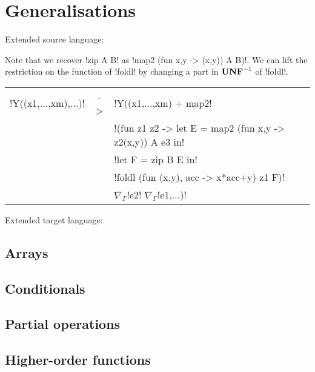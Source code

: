 \section{Generalisations}
\label{sec:generalisation}

Extended source language:



% 

Note that we recover !zip A B! as !map2 (fun x,y -> (x,y)) A B)!. 
We can lift the restriction on the function of !foldl! by changing a part in $\mathbf{UNF}^{-1}$ of !foldl!.
\begin{center}
\begin{tabular}{r c l}
    !Y((x1,...,xm),...)! & -> &  !Y((x1,...,xm) + map2! \\
        && !(fun z1 z2 -> let E = map2 (fun x,y -> z2(x,y)) A e3 in! \\
        &&  !let F = zip B E in!\\
        && !foldl (fun (x,y), acc  -> x*acc+y) z1 F)! \\
        && $\nabla_{\Gamma}$!e2! $\nabla_{\Gamma}$!e1,...)!
\end{tabular}
\end{center}

Extended target language:

% 

% 

\subsection{Arrays}

\subsection{Conditionals} 

\subsection{Partial operations} 

\subsection{Higher-order functions}
